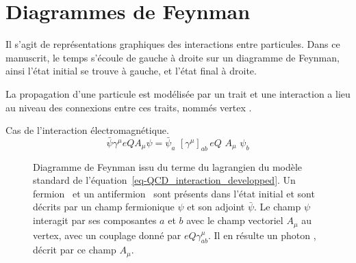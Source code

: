 \chapter{Diagrammes de Feynman}\label{annexe-fmf}


Il s'agit de représentations graphiques des interactions entre particules. Dans ce manuscrit, le temps s'écoule de gauche à droite sur un diagramme de Feynman, ainsi l'état initial se trouve à gauche, et l'état final à droite.

La propagation d'une particule est modélisée par un trait et une interaction a lieu au niveau des connexions entre ces traits, nommés \og vertex \fg.


Cas de l'interaction électromagnétique.
\begin{equation}
\bar{\psi}\gamma^\mu eQA_\mu \psi
=
\bar{\psi}_a \,\, [\gamma^\mu]_{ab} \, eQ \,\, A_\mu \,\, \psi_b
\label{eq-QCD_interaction_developped}
\end{equation}
\begin{figure}[h]
\centering
\vspace{\baselineskip}

\vspace{\baselineskip}
\caption[Diagramme de Feynman issu du terme~\eqref{eq-QCD_interaction_developped}.]{Diagramme de Feynman issu du terme du lagrangien du modèle standard de l'équation~\eqref{eq-QCD_interaction_developped}. Un fermion \fermion\ et un antifermion \antifermion\ sont présents dans l'état initial et sont décrits par un champ fermionique $\psi$ et son adjoint $\bar{\psi}$. Le champ $\psi$ interagit par ses composantes $a$ et $b$ avec le champ vectoriel $A_\mu$ au vertex, avec un couplage donné par $eQ\gamma^\mu_{ab}$. Il en résulte un photon \photon, décrit par ce champ $A_\mu$.}
\label{fig-fgraph-ff_Gamma1-large-annexeB}
\end{figure}